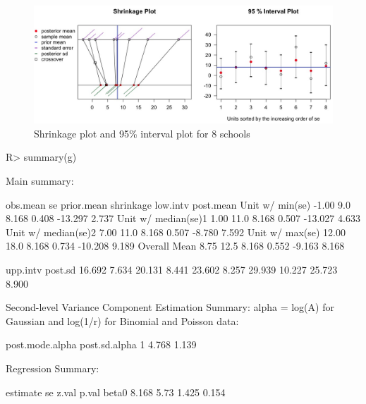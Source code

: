 \documentclass[article]{jss}
\begin{document}
\begin{figure}[h]
\begin{center}
\includegraphics[scale=0.3]{school1.png}
\caption{Shrinkage plot and 95\% interval plot for 8 schools}
\end{center}
\end{figure}

\begin{CodeChunk}
\begin{CodeInput}
R> summary(g)
\end{CodeInput}
\begin{CodeOutput}
Main summary:

                    obs.mean   se prior.mean shrinkage low.intv post.mean
Unit w/ min(se)        -1.00  9.0      8.168     0.408  -13.297     2.737
Unit w/ median(se)1     1.00 11.0      8.168     0.507  -13.027     4.633
Unit w/ median(se)2     7.00 11.0      8.168     0.507   -8.780     7.592
Unit w/ max(se)        12.00 18.0      8.168     0.734  -10.208     9.189
Overall Mean            8.75 12.5      8.168     0.552   -9.163     8.168

                     upp.intv post.sd
                       16.692   7.634
                       20.131   8.441
                       23.602   8.257
                       29.939  10.227
                       25.723   8.900

Second-level Variance Component Estimation Summary:
alpha = log(A) for Gaussian and log(1/r) for Binomial and Poisson data:

  post.mode.alpha post.sd.alpha
1           4.768         1.139


Regression Summary:

      estimate   se z.val p.val
beta0    8.168 5.73 1.425 0.154
\end{CodeOutput}
\end{CodeChunk}
\end{document}
